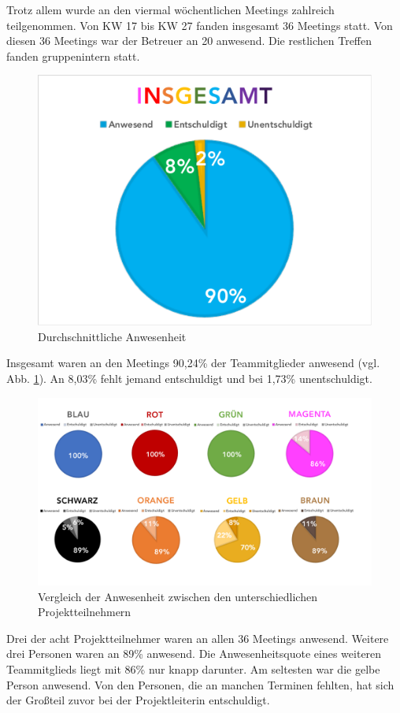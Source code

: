 \documentclass[../review_3.tex]{subfiles}
\begin{document}
Trotz allem wurde an den viermal wöchentlichen Meetings zahlreich teilgenommen. Von KW 17 bis KW 27 fanden insgesamt 36 Meetings statt. Von diesen 36 Meetings war der Betreuer an 20 anwesend. Die restlichen Treffen fanden gruppenintern statt.

\begin{figure} [h]
    \centering
    \includegraphics[width = 0.5\linewidth, trim=10pt 10pt 10pt 10pt, clip]{img/insgesamt.pdf}
    \caption{Durchschnittliche Anwesenheit}
    \label{ins}
\end{figure}

Insgesamt waren an den Meetings 90,24\% der Teammitglieder anwesend (vgl. Abb. \ref{ins}). An 8,03\% fehlt jemand entschuldigt und bei 1,73\% unentschuldigt.

\begin{figure} [H]
    \centering
    \includegraphics[width = \linewidth]{img/meetingsstatstik.pdf}
    \caption{Vergleich der Anwesenheit zwischen den unterschiedlichen Projektteilnehmern}
    \label{stat}
\end{figure}

Drei der acht Projektteilnehmer waren an allen 36 Meetings anwesend. Weitere drei Personen waren an 89\% anwesend. Die Anwesenheitsquote eines weiteren Teammitglieds liegt mit 86\% nur knapp darunter. Am seltesten war die \glqq gelbe\grqq{} Person anwesend. Von den Personen, die an manchen Terminen fehlten, hat sich der Großteil zuvor bei der Projektleiterin entschuldigt.
\end{document}
